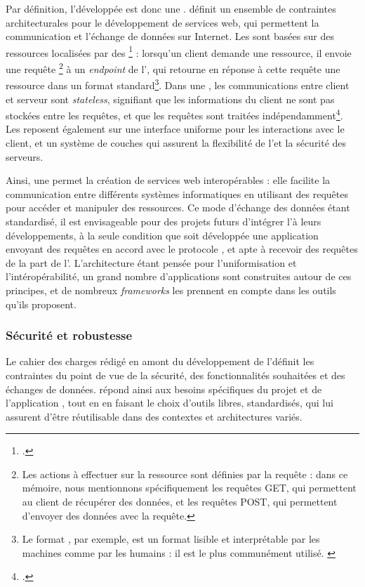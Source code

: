     Par définition, l'\api développée est donc une \api \rest. \rest définit un ensemble de contraintes architecturales pour le développement de services web, qui permettent la communication et l'échange de données sur Internet. Les \api \rest sont basées sur des ressources localisées par des \URL\footcite{APIRESTEst} : lorsqu'un client demande une ressource, il envoie une requête \http\footnote{Les actions à effectuer sur la ressource sont définies par la requête \http : dans ce mémoire, nous mentionnons spécifiquement les requêtes GET, qui permettent au client de récupérer des données, et les requêtes POST, qui permettent d'envoyer des données avec la requête.} à un \textit{endpoint} de l'\api, qui retourne en réponse à cette requête une ressource dans un format standard\footnote{Le format \json, par exemple, est un format lisible et interprétable par les machines comme par les humains : il est le plus communément utilisé. \cite{APIRESTEst}}. Dans une \api \rest, les communications entre client et serveur sont \textit{stateless}, signifiant que les informations du client ne sont pas stockées entre les requêtes, et que les requêtes sont traitées indépendamment\footcite{APIRESTEst}. Les \api \rest reposent également sur une interface uniforme pour les interactions avec le client, et un système de couches qui assurent la flexibilité de l'\api et la sécurité des serveurs.
    
    Ainsi, une \api \rest permet la création de services web interopérables : elle facilite la communication entre différents systèmes informatiques en utilisant des requêtes \http pour accéder et manipuler des ressources. Ce mode d'échange des données étant standardisé, il est envisageable pour des projets futurs d'intégrer l'\api à leurs développements, à la seule condition que soit développée une application envoyant des requêtes en accord avec le protocole \http, et apte à recevoir des requêtes de la part de l'\api. L'architecture \rest étant pensée pour l'uniformisation et l'intéropérabilité, un grand nombre d'applications sont construites autour de ces principes, et de nombreux \textit{frameworks} les prennent en compte dans les outils qu'ils proposent.
        
    \subsubsection{Sécurité et robustesse}
    Le cahier des charges rédigé en amont du développement de l'\api définit les contraintes du point de vue de la sécurité, des fonctionnalités souhaitées et des échanges de données. \exapi répond ainsi aux besoins spécifiques du projet et de l'application \eida, tout en en faisant le choix d'outils libres, standardisés, qui lui assurent d'être réutilisable dans des contextes et architectures variés.
    
